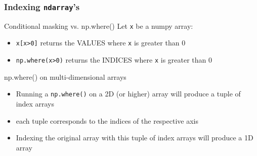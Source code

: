 \documentclass{beamer}
\newcommand{\code}[1]{\texttt{#1}}
\begin{document}
\begin{frame}	
	\frametitle{Indexing \code{ndarray}'s}
	
	\begin{block}{Conditional masking vs. np.where()}
		Let \code{x} be a numpy array:
		\begin{itemize}
			\item \code{x[x>0]} returns the VALUES where \code{x} is greater than 0
			\item \code{np.where(x>0)} returns the INDICES where \code{x} is greater than 0
		\end{itemize}
	\end{block}
	
	\begin{block}{np.where() on multi-dimensional arrays}
		\begin{itemize}
			\item Running a \code{np.where()} on a 2D (or higher) array will produce a tuple of index arrays
			\item each tuple corresponds to the indices of the respective axis
			\item Indexing the original array with this tuple of index arrays will produce a 1D array
		\end{itemize}
	\end{block}
	
\end{frame}
\end{document}
